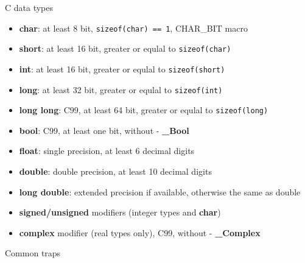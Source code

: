 \begin{frame}{C data types}
    \begin{itemize}
        \item \textbf{char}: at least 8 bit, \texttt{sizeof(char) == 1}, CHAR\_BIT macro
        \item \textbf{short}: at least 16 bit, greater or equlal to \texttt{sizeof(char)}
        \item \textbf{int}: at least 16 bit, greater or equlal to \texttt{sizeof(short)}
        \item \textbf{long}: at least 32 bit, greater or equlal to \texttt{sizeof(int)}
        \item \textbf{long long}: C99, at least 64 bit, greater or equlal to \texttt{sizeof(long)}
        \item \textbf{bool}: C99, at least one bit, without  - \textbf{\_Bool}
        \item \textbf{float}: single precision, at least 6 decimal digits
        \item \textbf{double}: double precision, at least 10 decimal digits
        \item \textbf{long double}: extended precision if available, otherwise the same as double
        \item \textbf{signed/unsigned} modifiers (integer types and \textbf{char})
        \item \textbf{complex} modifier (real types only), C99, without  - \textbf{\_Complex}
    \end{itemize}
\end{frame}
\begin{frame}{Common traps}
    \only<1>{
        
    }
    \only<2>{
        
    }
\end{frame}
